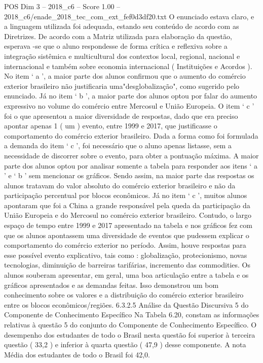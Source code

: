 \begin{textsample}{POS Dim 3 – 2018\_c6 – Score 1.00 – 2018\_c6/enade\_2018\_tec\_com\_ext\_fef0d3df20.txt}
O enunciado estava claro, e a linguagem utilizada foi adequada, estando seu conteúdo de acordo com as Diretrizes.
De acordo com a Matriz utilizada para elaboração da questão, esperava -se que o aluno respondesse de forma crítica e reflexiva sobre a integração sistêmica e multicultural dos contextos local, regional, nacional e internacional e também sobre economia internacional ( Instituições e Acordos ).
No item ‘ a ’, a maior parte dos alunos confirmou que o aumento do comércio exterior brasileiro não justificaria uma"desglobalização", como sugerido pelo enunciado.
Já no item ‘ b ’, a maior parte dos alunos optou por falar do aumento expressivo no volume do comércio entre Mercosul e União Europeia.
O item ‘ c ’ foi o que apresentou a maior diversidade de respostas, dado que era preciso apontar apenas 1 ( um ) evento, entre 1999 e 2017, que justificasse o comportamento do comércio exterior brasileiro.
Dada a forma como foi formulada a demanda do item ‘ c ’, foi necessário que o aluno apenas listasse, sem a necessidade de discorrer sobre o evento, para obter a pontuação máxima.
A maior parte dos alunos optou por analisar somente a tabela para responder aos itens ‘ a ’ e ‘ b ’ sem mencionar os gráficos.
Sendo assim, na maior parte das respostas os alunos tratavam do valor absoluto do comércio exterior brasileiro e não da participação percentual por blocos econômicos.
Já no item ‘ c ’, muitos alunos apontaram que foi a China a grande responsável pela queda da participação da União Europeia e do Mercosul no comércio exterior brasileiro.
Contudo, o largo espaço de tempo entre 1999 e 2017 apresentado na tabela e nos gráficos fez com que os alunos apontassem uma diversidade de eventos que pudessem explicar o comportamento do comércio exterior no período.
Assim, houve respostas para esse possível evento explicativo, tais como : globalização, protecionismo, novas tecnologias, diminuição de barreiras tarifárias, incremento das commodities.
Os alunos souberam apresentar, em geral, uma boa articulação entre a tabela e os gráficos apresentados e as demandas feitas.
Isso demonstrou um bom conhecimento sobre os valores e a distribuição do comércio exterior brasileiro entre os blocos econômicos/regiões. 6.3.2.5 Análise da Questão Discursiva 5 do Componente de Conhecimento Específico Na Tabela 6.20, constam as informações relativas à questão 5 do conjunto do Componente de Conhecimento Específico.
O desempenho dos estudantes de todo o Brasil nesta questão foi superior à terceira questão ( 33,2 ) e inferior à quarta questão ( 47,9 ) desse componente.
A nota Média dos estudantes de todo o Brasil foi 42,0.

\end{textsample}
